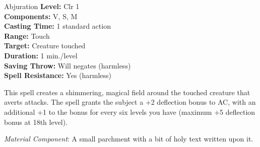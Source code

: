 {Abjuration}
{
	\textbf{Level:}
	Clr 1\\
	\textbf{Components:}
	V, S, M\\
	\textbf{Casting Time:}
	1 standard action\\
	\textbf{Range:}
	Touch\\
	\textbf{Target:}
	Creature touched\\
	\textbf{Duration:}
	1 min./level\\
	\textbf{Saving Throw:}
	Will negates (harmless)\\
	\textbf{Spell Resistance:}
	Yes (harmless)\\
}
{
	This spell creates a shimmering, magical field around the touched creature that averts attacks. The spell grants the subject a +2 deflection bonus to AC, with an additional +1 to the bonus for every six levels you have (maximum +5 deflection bonus at 18th level).

	\textit{Material Component}:
	A small parchment with a bit of holy text written upon it.

}
